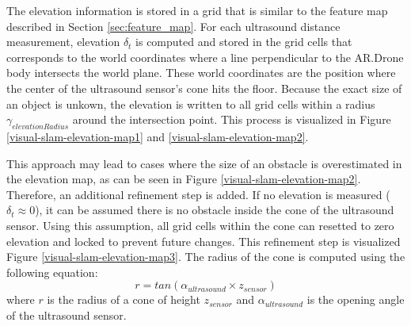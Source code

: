 The elevation information is stored in a grid that is similar to the feature map described in Section \ref{sec:feature_map}.
For each ultrasound distance measurement, elevation $\delta_t$ is computed and stored in the grid cells that corresponds to the world coordinates where a line perpendicular to the AR.Drone body intersects the world plane.
These world coordinates are the position where the center of the ultrasound sensor's cone hits the floor.
Because the exact size of an object is unkown, the elevation is written to all grid cells within a radius $\gamma_{elevationRadius}$ around the intersection point.
This process is visualized in Figure \ref{visual-slam-elevation-map1} and \ref{visual-slam-elevation-map2}.

This approach may lead to cases where the size of an obstacle is overestimated in the elevation map, as can be seen in Figure \ref{visual-slam-elevation-map2}.
Therefore, an additional refinement step is added. %
If no elevation is measured ($\delta_t \approx 0$), it can be assumed there is no obstacle inside the cone of the ultrasound sensor.
Using this assumption, all grid cells within the cone can resetted to zero elevation and locked to prevent future changes.
This refinement step is visualized Figure \ref{visual-slam-elevation-map3}.
The radius of the cone is computed using the following equation:
\begin{equation}
r = tan (\alpha_{ultrasound} \times z_{sensor})
\end{equation}
where $r$ is the radius of a cone of height $z_{sensor}$ and $\alpha_{ultrasound}$ is the opening angle of the ultrasound sensor.


